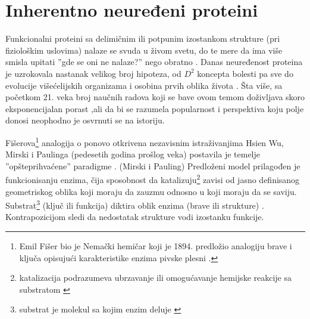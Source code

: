 
\chapter{Inherentno neuređeni proteini} %

\label{IDP} %


Funkcionalni proteini sa delimičnim ili potpunim izostankom strukture (pri
fiziološkim uslovima) nalaze se svuda u živom svetu, do te mere da ima više
smisla upitati ''gde se oni ne nalaze?'' nego obratno \parencite{uversky2016}.
Danas neuređenost proteina je uzrokovala nastanak velikog broj hipoteza, od
$D^2$ koncepta bolesti \parencite{d2uversky2008} pa sve do evolucije
višećelijskih organizama \parencite{romero2006} i osobina prvih oblika života
\parencite{trifonov2000, uversky2016}. Šta više, sa početkom 21. veka broj
naučnih radova koji se bave ovom temom doživljava skoro eksponencijalan
porast \parencite{oldfield2014},ali  da bi se razumela popularnost i 
perspektiva koju polje donosi neophodno je osvrnuti se na istoriju.

Fišerova\footnote{ Emil Fišer bio je Nemački hemičar koji je 1894. predložio
analogiju brave i ključa opisujući karakteristike enzima pivske
plesni \parencite{dunker2001}.  } analogija o  ponovo
otkrivena nezavisnim istraživanjima Hsien Wu,  Mirski i Paulinga (pedesetih
godina prošlog veka) postavila je temelje ''opšteprihvaćene''
 paradigme \parencite{dunker2001}.
 (Mirski i Pauling) Predloženi model prilagođen je
funkcionisanju enzima, čija sposobnost da katalizuju\footnote{katalizacija
podrazumeva ubrzavanje ili omogućavanje hemijske reakcije sa
substratom \parencite{biology}}  zavisi od jasno definisanog geometriskog oblika
koji moraju da zauzmu odnosno u koji moraju da se saviju.
Substrat\footnote{substrat je molekul sa kojim enzim
deluje \parencite{biology}} (ključ ili funkcija) diktira oblik enzima (brave ili
strukture) \parencite{biology}.  Kontrapozicijom sledi da nedostatak strukture
vodi izostanku funkcije.

